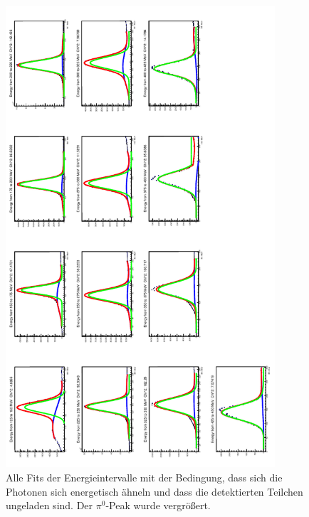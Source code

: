 \documentclass[a4paper,11pt,oneside,final,german,openbib,pdftex]{scrbook}
\begin{document}
{\begin{appendix}
\begin{figure}[h!]
	\begin{center}
		\includegraphics[width=100mm]{20170405StrahlzeitNoCutAllFits}
		\caption[Strahlzeit: Alle Fits keine weiteren Bedingungen]{Alle Fits der Energieintervalle mit der Bedingung, dass sich die Photonen sich energetisch ähneln und dass die detektierten Teilchen ungeladen sind. Der $\pi^0$-Peak wurde vergr\"o{\ss}ert. }
		\label{fig:similarenergyallfitsuncharged}
	\end{center}
\end{figure}

\end{appendix}}
\end{document}

